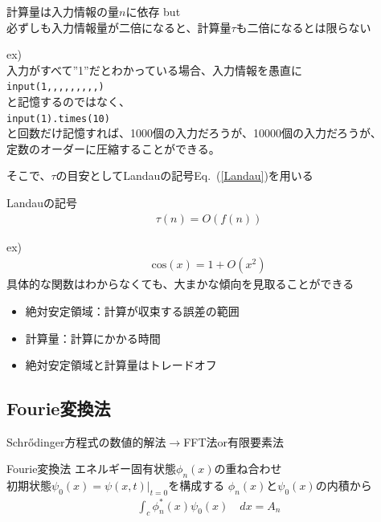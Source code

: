 \documentclass[unicode, 12pt, aspectratio=169]{beamer}
\newcommand{\eref}[1]{Eq.~(\ref{#1})}
\begin{document}
\begin{frame}
  \begin{block}{計算量は入力情報の量$n$に依存}
    \alert{but}\\
    必ずしも入力情報量が二倍になると、計算量$\tau$も二倍になるとは限らない
  \end{block}
  ex)\\
      入力がすべて”1”だとわかっている場合、入力情報を愚直に\\
      \texttt{input(1,,,,,,,,,)}\\
      と記憶するのではなく、\\
      \texttt{input(1).times(10)}\\
      と回数だけ記憶すれば、1000個の入力だろうが、10000個の入力だろうが、\\
      定数のオーダーに圧縮することができる。
\end{frame}

\begin{frame}
    そこで、$\tau$の目安としてLandauの記号\eref{Landau}を用いる
    \begin{block}{Landauの記号}
      \begin{align}
        \tau(n) = O(f(n)) \label{Landau}
      \end{align}
    \end{block}
    ex)\\
    \begin{align}
      \mathrm{cos}(x) = 1 + O(x^{2})
    \end{align}
    具体的な関数はわからなくても、大まかな傾向を見取ることができる
\end{frame}

\begin{frame}
      \begin{itemize}
        \item 絶対安定領域：計算が収束する誤差の範囲
        \item 計算量：計算にかかる時間
        \item 絶対安定領域と計算量はトレードオフ
      \end{itemize}
\end{frame}


\subsection{Fourie変換法}
\frame{\insertsubsection}
\begin{frame}
  Schrődinger方程式の数値的解法$\rightarrow$FFT法or有限要素法\\
    \begin{block}{Fourie変換法}
    エネルギー固有状態$\phi_n(x)$の重ね合わせ\\
    初期状態$\psi_0(x) = \psi(x, t)|_{t=0}$を構成する
    $\phi_n(x)$と$\psi_0(x)$の内積から
    \begin{align}
      \int_{c}\phi^*_n(x)\psi_0(x)\quad dx = A_n\label{combolution}
    \end{align}
    \end{block}
\end{frame}
\end{document}
